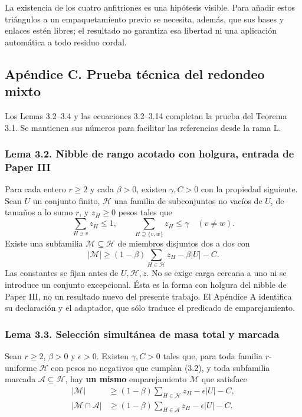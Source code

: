 \documentclass[spanish,11pt,a4paper]{article}
\begin{document}
La existencia de los cuatro anfitriones es una hipótesis visible. Para añadir estos triángulos a un empaquetamiento previo se necesita, además, que sus bases y enlaces estén libres; el resultado no garantiza esa libertad ni una aplicación automática a todo residuo cordal.

\subsection{Apéndice C. Prueba técnica del redondeo mixto}\label{apendice-c.-prueba-tecnica-del-redondeo-mixto}

Los Lemas 3.2--3.4 y las ecuaciones 3.2--3.14 completan la prueba del Teorema 3.1. Se mantienen sus números para facilitar las referencias desde la rama L.

\subsubsection{\texorpdfstring{Lema 3.2. {\ttfamily\small Nibble} de rango acotado con holgura, entrada de Paper III}{Lema 3.2. Nibble de rango acotado con holgura, entrada de Paper III}}\label{lema-3.2.-nibble-de-rango-acotado-con-holgura-entrada-de-paper-iii}

Para cada entero \(r\ge2\) y cada \(\beta>0\), existen \(\gamma,C>0\) con la propiedad siguiente. Sean \(U\) un conjunto finito, \(\mathcal H\) una familia de subconjuntos no vacíos de \(U\), de tamaños a lo sumo \(r\), y \(z_H\ge0\) pesos tales que \[
\sum_{H\ni v}z_H\le1,\qquad
\sum_{H\supseteq\{v,w\}}z_H\le\gamma\quad(v\ne w).
\tag{3.2}
\] Existe una subfamilia \(\mathcal M\subseteq\mathcal H\) de miembros disjuntos dos a dos con \[
|\mathcal M|\ge(1-\beta)\sum_{H\in\mathcal H}z_H-\beta|U|-C.
\tag{3.3}
\] Las constantes se fijan antes de \(U,\mathcal H,z\). No se exige carga cercana a uno ni se introduce un conjunto excepcional. Ésta es la forma con holgura del nibble de Paper III, no un resultado nuevo del presente trabajo. El Apéndice A identifica su declaración y el adaptador, que sólo traduce el predicado de emparejamiento.

\subsubsection{Lema 3.3. Selección simultánea de masa total y marcada}\label{lema-3.3.-seleccion-simultanea-de-masa-total-y-marcada}

Sean \(r\ge2\), \(\beta>0\) y \(\epsilon>0\). Existen \(\gamma,C>0\) tales que, para toda familia \(r\)-uniforme \(\mathcal H\) con pesos no negativos que cumplan (3.2), y toda subfamilia marcada \(\mathcal A\subseteq\mathcal H\), hay \textbf{un mismo} emparejamiento \(\mathcal M\) que satisface \[
\begin{aligned}
|\mathcal M|&\ge(1-\beta)\sum_{H\in\mathcal H}z_H-\epsilon|U|-C,\\
|\mathcal M\cap\mathcal A|&\ge(1-\beta)\sum_{H\in\mathcal A}z_H-\epsilon|U|-C.
\end{aligned}
\tag{3.4}
\]
\end{document}

